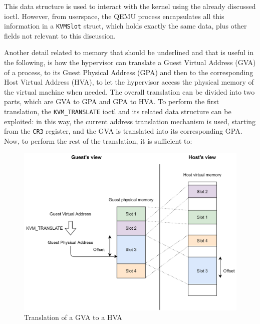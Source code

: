 This data structure is used to interact with the kernel using the already discussed ioctl. However, from userspace, the QEMU process encapsulates all this information in a \texttt{KVMSlot} struct, which holds exactly the same data, plus other fields not relevant to this discussion. 
\par 
Another detail related to memory that should be underlined and that is useful in the following, is how the hypervisor can translate a Guest Virtual Address (GVA) of a process, to its Guest Physical Address (GPA) and then to the corresponding Host Virtual Address (HVA), to let the hypervisor access the physical memory of the virtual machine when needed. The overall translation can be divided into two parts, which are GVA to GPA and GPA to HVA. To perform the first translation, the \texttt{KVM\_TRANSLATE} ioctl and its related data structure can be exploited: in this way, the current address translation mechanism is used, starting from the \texttt{CR3} register, and the GVA is translated into its corresponding GPA. Now, to perform the rest of the translation, it is sufficient to: 
\begin{figure}[t]
\centering
  \includegraphics[width=\textwidth]{images/translation.png}
  \caption{Translation of a GVA to a HVA}
  \label{fig:translation}
\end{figure}

